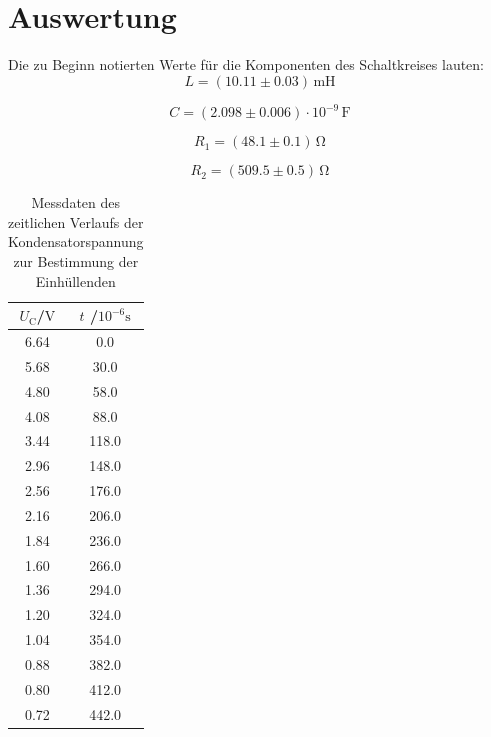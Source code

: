 \section{Auswertung}
\label{sec:Auswertung}
Die zu Beginn notierten Werte für die Komponenten des Schaltkreises lauten:
\begin{equation*}
	L=(10.11 \pm 0.03) \,\si{\milli\henry}
\end{equation*}

\begin{equation*}
	C=(2.098 \pm 0.006) \cdot 10^{-9} \, \si{\farad}
\end{equation*}

\begin{equation*}
	R_\text{1}= (48.1 \pm 0.1) \, \si{\ohm}
\end{equation*}

\begin{equation*}
	R_\text{2}= (509.5\pm 0.5)\,\si{\ohm}
\end{equation*}



\begin{table}
	\caption{Messdaten des zeitlichen Verlaufs der Kondensatorspannung zur Bestimmung der Einhüllenden}
	\label{tab:messung1}
	\centering
	\begin{tabular}{cc}
		\toprule
		$U_\text{C}$/$\si{\volt}$ & $t$ /$10^{-6}\si{\second}$ \\
		\midrule
		6.64                      & 0.0                        \\
		5.68                      & 30.0                       \\
		4.80                      & 58.0                       \\
		4.08                      & 88.0                       \\
		3.44                      & 118.0                      \\
		2.96                      & 148.0                      \\
		2.56                      & 176.0                      \\
		2.16                      & 206.0                      \\
		1.84                      & 236.0                      \\
		1.60                      & 266.0                      \\
		1.36                      & 294.0                      \\
		1.20                      & 324.0                      \\
		1.04                      & 354.0                      \\
		0.88                      & 382.0                      \\
		0.80                      & 412.0                      \\
		0.72                      & 442.0                      \\
		\bottomrule
	\end{tabular}
\end{table}

